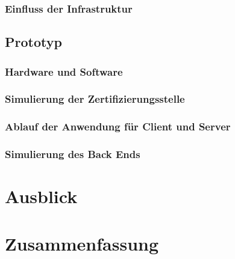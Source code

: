 \documentclass[doktyp=barbeit]{TUBAFarbeiten}
\begin{document}
		\subsubsection{Einfluss der Infrastruktur}
			\label{sec: impl einfluss der infrastruktur}
			

	\subsection{Prototyp}
		\label{sec: impl prototyp allgemein}
		

		\subsubsection{Hardware und Software}
			\label{sec: impl soft hard}
			

		\subsubsection{Simulierung der Zertifizierungsstelle}
			\label{sec: impl prototyp zertifizierungstelle}
			

		\subsubsection{Ablauf der Anwendung für Client und Server}
			\label{sec: impl prototyp anwendung}
			

		\subsubsection{Simulierung des Back Ends}
			\label{sec: impl prototyp back end}
			

\newpage
\section{Ausblick}
	

\newpage
\section{Zusammenfassung}
	
\end{document}
